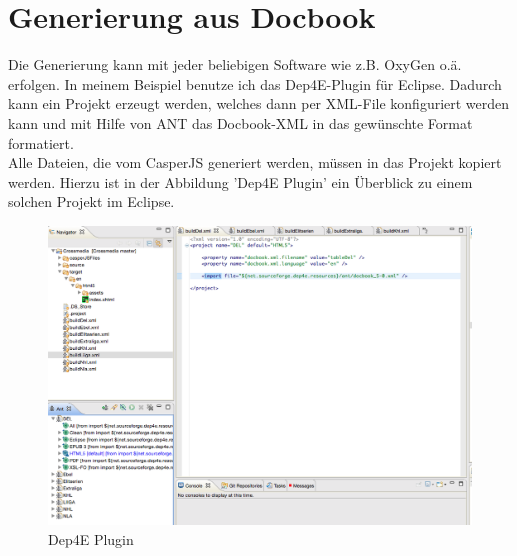 \chapter{Generierung aus Docbook}
Die Generierung kann mit jeder beliebigen Software wie z.B. OxyGen o.\"a. erfolgen.
In meinem Beispiel benutze ich das Dep4E-Plugin f\"ur Eclipse.
Dadurch kann ein Projekt erzeugt werden, welches dann per XML-File konfiguriert werden kann und mit Hilfe von ANT das Docbook-XML in das gew\"unschte Format formatiert.\\
Alle Dateien, die vom CasperJS generiert werden, m\"ussen in das Projekt kopiert werden.
Hierzu ist in der Abbildung 'Dep4E Plugin'  ein \"Uberblick zu einem solchen Projekt im Eclipse.
\begin{figure}[h!]
  \caption{Dep4E Plugin}
  \centering
    \includegraphics[scale=0.39]{Abbildungen/Dep4Plugin}
\end{figure}


